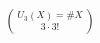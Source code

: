 \documentclass[preview]{standalone}
\begin{document}
\begin{align*}
U_3( X ) =  \# X \choose 3 \cdot 3!
\end{align*}
\end{document}
